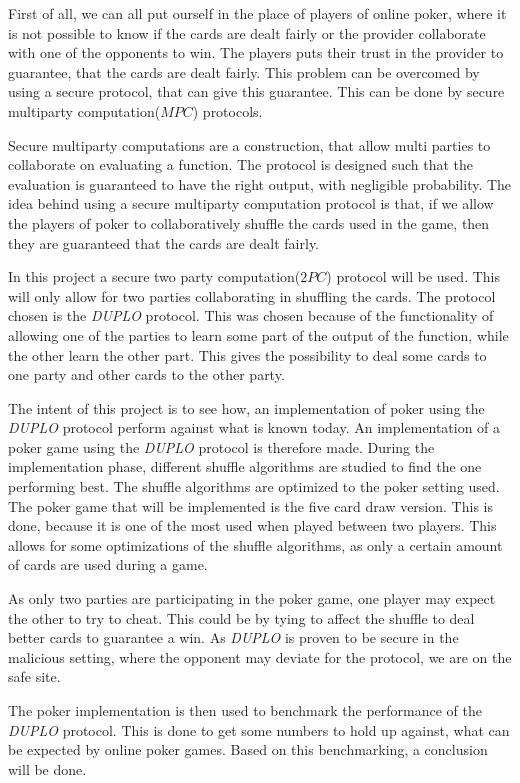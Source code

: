 \documentclass[twoside,11pt,openright]{report}
\newcommand{\DUPLO}{\textit{DUPLO} }
\begin{document}
First of all, we can all put ourself in the place of players of online poker, where it is not possible to know if the cards are dealt fairly or the provider collaborate with one of the opponents to win. The players puts their trust in the provider to guarantee, that the cards are dealt fairly. This problem can be overcomed by using a secure protocol, that can give this guarantee. This can be done by secure multiparty computation($MPC$) protocols.

Secure multiparty computations are a construction, that allow multi parties to collaborate on evaluating a function. The protocol is designed such that the evaluation is guaranteed to have the right output, with negligible probability. The idea behind using a secure multiparty computation protocol is that, if we allow the players of poker to collaboratively shuffle the cards used in the game, then they are guaranteed that the cards are dealt fairly.

In this project a secure two party computation($2PC$) protocol will be used. This will only allow for two parties collaborating in shuffling the cards. The protocol chosen is the \DUPLO protocol. This was chosen because of the functionality of allowing one of the parties to learn some part of the output of the function, while the other learn the other part. This gives the possibility to deal some cards to one party and other cards to the other party.

The intent of this project is to see how, an implementation of poker using the \DUPLO protocol perform against what is known today. An implementation of a poker game using the \DUPLO protocol is therefore made. During the implementation phase, different shuffle algorithms are studied to find the one performing best. The shuffle algorithms are optimized to the poker setting used. The poker game that will be implemented is the five card draw version. This is done, because it is one of the most used when played between two players. This allows for some optimizations of the shuffle algorithms, as only a certain amount of cards are used during a game.

As only two parties are participating in the poker game, one player may expect the other to try to cheat. This could be by tying to affect the shuffle to deal better cards to guarantee a win. As \DUPLO is proven to be secure in the malicious setting, where the opponent may deviate for the protocol, we are on the safe site.

The poker implementation is then used to benchmark the performance of the \DUPLO protocol. This is done to get some numbers to hold up against, what can be expected by online poker games. Based on this benchmarking, a conclusion will be done.
\end{document}

